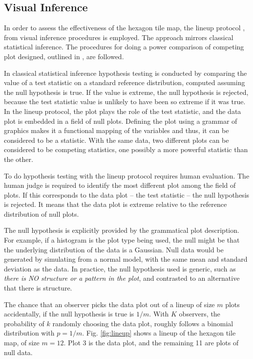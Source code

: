 \documentclass[12pt]{article}
\begin{document}
\subsection{Visual Inference}
\label{sec:vi}

In order to assess the effectiveness of the hexagon tile map, the lineup
protocol \citep{GIIV}, \citep{BCHLLSW09} from visual inference
procedures is employed. The approach mirrors classical statistical
inference. The procedures for doing a power comparison of competing plot
designed, outlined in \citet{GTPCCD}, are followed.

In classical statistical inference hypothesis testing is conducted by
comparing the value of a test statistic on a standard reference
distribution, computed assuming the null hypothesis is true. If the
value is extreme, the null hypothesis is rejected, because the test
statistic value is unlikely to have been so extreme if it was true. In
the lineup protocol, the plot plays the role of the test statistic, and
the data plot is embedded in a field of null plots. Defining the plot
using a grammar of graphics \citep{ggplot2} makes it a functional
mapping of the variables and thus, it can be considered to be a
statistic. With the same data, two different plots can be considered to
be competing statistics, one possibly a more powerful statistic than the
other.

To do hypothesis testing with the lineup protocol requires human
evaluation. The human judge is required to identify the most different
plot among the field of plots. If this corresponds to the data plot --
the test statistic -- the null hypothesis is rejected. It means that the
data plot is extreme relative to the reference distribution of null
plots.

The null hypothesis is explicitly provided by the grammatical plot
description. For example, if a histogram is the plot type being used,
the null might be that the underlying distribution of the data is a
Gaussian. Null data would be generated by simulating from a normal
model, with the same mean and standard deviation as the data. In
practice, the null hypothesis used is generic, such as \emph{there is NO
structure or a pattern in the plot}, and contrasted to an alternative
that there is structure.

The chance that an observer picks the data plot out of a lineup of size
\(m\) plots accidentally, if the null hypothesis is true is \(1/m\).
With \(K\) observers, the probability of \(k\) randomly choosing the
data plot, roughly follows a binomial distribution with \(p=1/m\). Fig.
\ref{fig:lineup} shows a lineup of the hexagon tile map, of size
\(m=12\). Plot 3 is the data plot, and the remaining 11 are plots of
null data.
\end{document}
